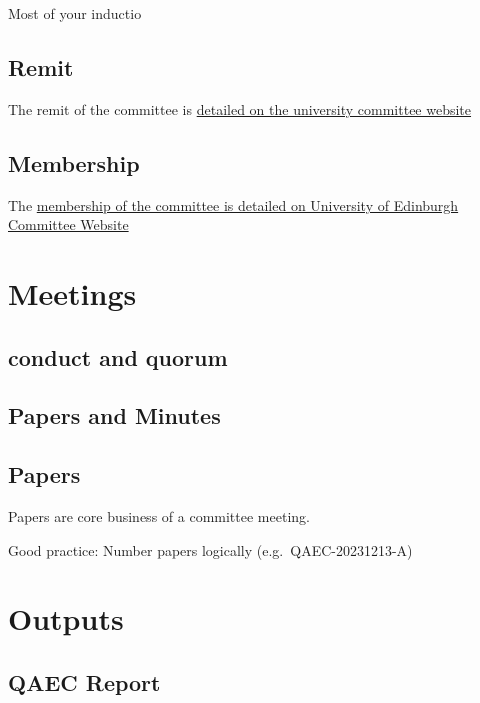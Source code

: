\documentclass[
  letterpaper,
  DIV=11,
  numbers=noendperiod]{scrreprt}
\begin{document}
Most of your inductio

\hypertarget{remit}{%
\chapter{Remit}\label{remit}}

The remit of the committee is
\href{http://www.committees.ed.ac.uk/veterinary-medicine-quality-assurance-enhancement-committee}{detailed
on the university committee website}

\hypertarget{membership}{%
\chapter{Membership}\label{membership}}

The
\href{http://www.committees.ed.ac.uk/veterinary-medicine-quality-assurance-enhancement-committee/membership}{membership
of the committee is detailed on University of Edinburgh Committee
Website}

\part{Meetings}

\hypertarget{conduct-and-quorum}{%
\chapter{conduct and quorum}\label{conduct-and-quorum}}

\hypertarget{papers-and-minutes}{%
\chapter{Papers and Minutes}\label{papers-and-minutes}}

\hypertarget{papers}{%
\chapter{Papers}\label{papers}}

Papers are core business of a committee meeting.

Good practice: Number papers logically (e.g.~QAEC-20231213-A)

\part{Outputs}

\hypertarget{qaec-report}{%
\chapter{QAEC Report}\label{qaec-report}}
\end{document}
